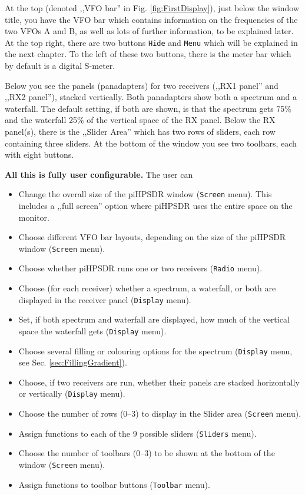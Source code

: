 \documentclass[12pt]{book}
\def\rett#1{\texttt{\color{red}#1}}
\def\bltt#1{\texttt{\color{blue}#1}}
\def\pH{pi\-HPSDR\xspace}
\begin{document}
At the top (denoted ,,VFO bar'' in Fig. \ref{fig:FirstDisplay}),
just below the window title, you have the VFO bar which contains information on the frequencies of the two
VFOs A and B,
as well as lots of further information, to be explained later. At the top right, there are two buttons
\rett{Hide}
and \rett{Menu} which will be explained in the next chapter. To the left of these two buttons, there is the
meter bar which by default is a digital S-meter.

Below you see the panels (panadapters) for two receivers (,,RX1 panel'' and ,,RX2 panel''), stacked vertically.
Both panadapters show both a spectrum and a waterfall. The default setting, if both are shown, is that
the spectrum gets 75\% and the waterfall 25\% of the vertical space of the RX panel.
Below the RX panel(s), there is the ,,Slider Area'' which has two rows of sliders, each row containing
three sliders.
At the bottom of the window you see two toolbars, each with eight buttons.

\clearpage
\textbf{All this is fully user configurable.} The user can
\begin{itemize}
\item{Change the overall size of the \pH window (\bltt{Screen} menu). This includes
a ,,full screen'' option where \pH uses the entire space on the monitor.}
\item{Choose different VFO bar layouts, depending on the size of the \pH window (\bltt{Screen} menu).}
\item{Choose whether \pH runs one or two receivers (\bltt{Radio} menu).}
\item{Choose (for each receiver) whether a spectrum, a waterfall, or both are displayed in the receiver
panel (\bltt{Display} menu).}
\item{Set, if both spectrum and waterfall are displayed, how much of the vertical space the waterfall
gets (\bltt{Display} menu).}
\item{Choose several filling or colouring options for the spectrum (\bltt{Display} menu, see
Sec. \ref{sec:FillingGradient}).}
\item{Choose, if two receivers are run, whether their panels are stacked horizontally or
vertically (\bltt{Display} menu).}
\item{Choose the number of rows (0--3) to display in the Slider area (\bltt{Screen} menu).}
\item{Assign functions to each of the 9 possible sliders (\bltt{Sliders} menu).}
\item{Choose the number of toolbars (0--3) to be shown at the bottom of the window (\bltt{Screen} menu).}
\item{Assign functions to toolbar buttons (\bltt{Toolbar} menu).}
\end{itemize}
\end{document}
